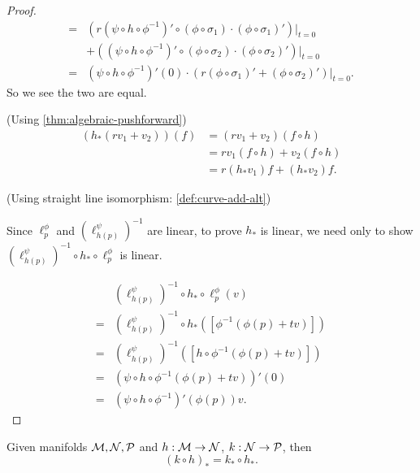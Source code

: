 \documentclass[../main.tex]{subfiles}
\begin{document}
\begin{proof}
\[\begin{aligned}
        =&(r(\psi\circ h\circ \phi ^{-1})'\circ(\phi\circ\sigma_1)
        \cdot(\phi\circ\sigma_1)')|_{t=0} \\
        &+((\psi\circ h\circ \phi ^{-1})'\circ(\phi\circ\sigma_2)
        \cdot(\phi\circ\sigma_2)')|_{t=0} \\
        =&(\psi\circ h\circ \phi ^{-1})'(0)\cdot(r(\phi\circ\sigma_1)' + 
        (\phi\circ\sigma_2)')|_{t=0}.
        \end{aligned}
        \]
        So we see the two are equal. \par
        (Using \cref{thm:algebraic-pushforward})
        \[
        \begin{aligned}
            (h_*(rv_1+v_2))(f) &= (rv_1+v_2)(f\circ h) \\
            &= rv_1(f\circ h)+v_2(f\circ h) \\
            &= r(h_*v_1)f+(h_*v_2)f.
        \end{aligned}
        \]
        \par
        (Using straight line isomorphism: \cref{def:curve-add-alt})
        \begin{center}
            
        \end{center}
        Since \(\ell_p^\phi\) and \((\ell_{h(p)}^\psi)^{-1}\) are linear, to prove 
        \(h_*\) is linear, we need only to show \((\ell_{h(p)}^\psi)^{-1} \circ 
        h_* \circ \ell_p^\phi\) is linear. \par
        \[
        \begin{aligned}
            &(\ell_{h(p)}^\psi) ^{-1} \circ h_* \circ \ell_p^\phi(v) \\
            =&(\ell_{h(p)}^\psi)^{-1} \circ h_*([\phi ^{-1}(\phi(p)+tv)]) \\
            =&(\ell_{h(p)}^\psi)^{-1}([h\circ\phi ^{-1}(\phi(p)+tv)]) \\
            =&(\psi \circ h \circ \phi ^{-1}(\phi(p)+tv))'(0) \\
            =&(\psi \circ h \circ \phi ^{-1})'(\phi(p))v.
        \end{aligned}
        \]
    \end{proof}
    \begin{theorem}\label{thm:pushforward-associativity}
        Given manifolds \(\manifold[M], \manifold[N], \manifold[P]\) and 
        \(h : \manifold[M] \to \manifold[N]\), \(k : \manifold[N] \to 
        \manifold[P]\), then 
        \[
        (k\circ h)_*=k_*\circ h_*.
        \]
    \end{theorem}
\end{document}
